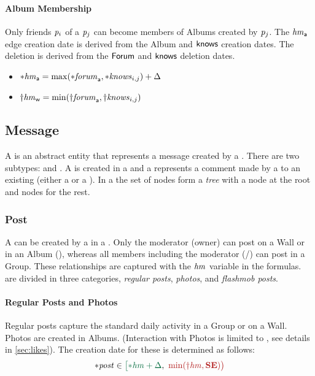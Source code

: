 \paragraph{Album Membership}
Only friends $\mathit{p}_i$ of a \tPerson $\mathit{p}_j$ can become members of Albums created by $\mathit{p}_j$. The \tHasMember $\mathit{hm}_{\mathsf{a}}$ edge creation date is derived from the Album and $\textsf{knows}$ creation dates. The deletion is derived from the $\textsf{Forum}$ and $\textsf{knows}$ deletion dates.
\begin{itemize}
    \item ${\ast}\mathit{\mathit{hm}}_\textsf{a} = \max ( {\ast}\mathit{\mathit{forum}}_\textsf{a}, {\ast}\mathit{\mathit{knows}}_{i,j} ) + \Delta $
    \item ${\dagger}\mathit{\mathit{hm}}_{\mathsf{w}} = \min ( {\dagger}\mathit{\mathit{forum}}_\textsf{a}, {\dagger}\mathit{\mathit{knows}}_{i,j} ) $
\end{itemize}

\subsection{Message}
\label{sec:message}

A \tMessage is an abstract entity that represents a message created by a \tPerson.
There are two \tMessage subtypes: \tPost and \tComment.
A \tPost is created in a \tForum and a \tComment represents a comment made by a \tPerson to an existing \tMessage (either a \tPost or a \tComment).
In a \tForum the set of \tMessage nodes form a \emph{tree} with a \tPost node at the root and \tComment nodes for the rest.

\subsubsection{Post}

A \tPost can be created by a \tPerson in a \tForum.
Only the moderator (\ie owner) can post on a Wall or in an Album (\tHasModerator),
whereas all members including the moderator (\tHasMember/\tHasModerator) can post in a Group.
These relationships are captured with the $\mathit{hm}$ variable in the formulas.
\tPosts are divided in three categories, \emph{regular posts}, \emph{photos}, and \emph{flashmob posts}.

\paragraph{Regular Posts and Photos}

Regular posts capture the standard daily activity in a Group or on a Wall.
Photos are created in Albums. (Interaction with Photos is limited to \tLikes, see details in \autoref{sec:likes}). The creation date for these is determined as follows:
$$\varc{\ePost} \in \interval{\varc{\eHasMember} + \Delta}{\min (\vard{\eHasMember}, \xSE) }$$

